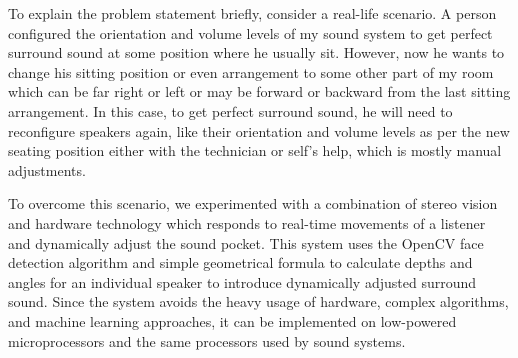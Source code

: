 \documentclass[../../../patent_v1.tex]{subfiles}
\begin{document}
To explain the problem statement briefly, consider a real-life scenario. A person 
configured the orientation and volume levels of my sound system to get perfect 
surround sound at some position where he usually sit. However, now he wants to 
change his sitting position or even arrangement to some other part of my room 
which can be far right or left or may be forward or backward from the last sitting 
arrangement. In this case, to get perfect surround sound, he will need to reconfigure  
speakers again, like their orientation and volume levels as per the new seating 
position either with the technician or self's help, which is mostly manual adjustments.

To overcome this scenario, we experimented with a combination of stereo vision and 
hardware technology which responds to real-time movements of a listener and dynamically 
adjust the sound pocket. This system uses the OpenCV face detection algorithm and 
simple geometrical formula to calculate depths and angles for an individual speaker 
to introduce dynamically adjusted surround sound. Since the system avoids the heavy 
usage of hardware, complex algorithms, and machine learning approaches, it can be 
implemented on low-powered microprocessors and the same processors used by sound systems.
\end{document}
